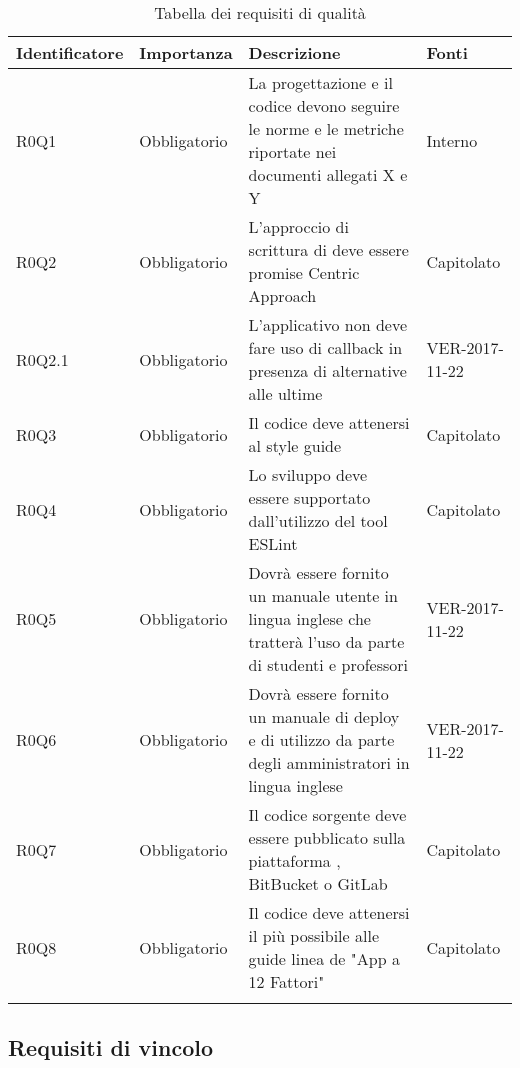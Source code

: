 \documentclass[AnalisiDeiRequisiti.tex]{subfiles}
\begin{document}
\label{table:Tabella requisiti di qualita'} %
\renewcommand*{\arraystretch}{1.2}
\begin{longtable}[H]{p{2.5cm}p{2.5cm}p{5cm}p{2cm}}
	\rowcolor{CHeader} 
	\color{CHeaderText} \textbf{Identificatore} & \color{CHeaderText} \textbf{Importanza} & \color{CHeaderText} \textbf{Descrizione} & \color{CHeaderText} \textbf{Fonti} \\  
	\endhead
	R0Q1 & Obbligatorio & La progettazione e il codice devono seguire le norme e le metriche riportate nei documenti allegati X e Y & Interno \\   %
	R0Q2 & Obbligatorio & L'approccio di scrittura di \citGloss{JavaScript} deve essere promise Centric Approach & Capitolato \\  
	R0Q2.1 & Obbligatorio & L'applicativo non deve fare uso di callback in presenza di alternative alle ultime & VER-2017-11-22 \\  
	R0Q3 & Obbligatorio & Il codice \citGloss{JavaScript} deve attenersi al \citGloss{airbnb} \citGloss{JavaScript} style guide & Capitolato \\  
	R0Q4 & Obbligatorio & Lo sviluppo deve essere supportato dall'utilizzo del tool ESLint & Capitolato \\  
	R0Q5 & Obbligatorio & Dovrà essere fornito un manuale utente in lingua inglese che tratterà l'uso da parte di studenti e professori & VER-2017-11-22 \\  
	R0Q6 & Obbligatorio & Dovrà essere fornito un manuale di deploy e di utilizzo da parte degli amministratori in lingua inglese & VER-2017-11-22 \\
	R0Q7 & Obbligatorio & Il codice sorgente deve essere pubblicato sulla piattaforma \citGloss{GitHub}, BitBucket o GitLab & Capitolato \\  
	R0Q8 & Obbligatorio & Il codice deve attenersi il più possibile alle guide linea de "App a 12 Fattori" & Capitolato \\  
	\hiderowcolors
	\caption{Tabella dei requisiti di qualità}
\end{longtable}

\subsection{Requisiti di vincolo}
\end{document}
